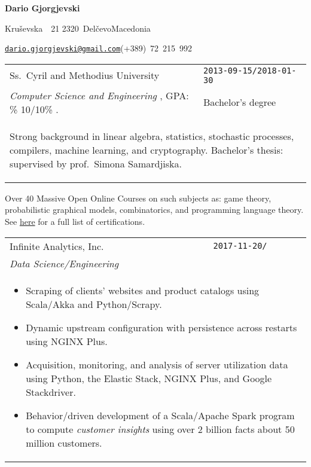\documentclass[version=last, paper=A4, DIV=12, toc=bibliography]{scrartcl}%
\makeatletter
\newcommand*{\EducationEntry}[6]{%
  \noindent%
  \begin{tabular}{p{.7\textwidth-2\tabcolsep}>{\raggedleft\arraybackslash}p{.3\textwidth-2\tabcolsep}}
    \textsf{#2} & \Verb+#1+\\
    \textit{#4}, GPA\@: \num[round-mode=places, round-precision=2, round-integer-to-decimal]{#5}. & #3\\
    \multicolumn{2}{p{\textwidth-2\tabcolsep}}{\begin{addmargin}{2em}\small#6\end{addmargin}}
  \end{tabular}%
}
\newcommand*{\WorkEntry}[4]{%
  \noindent%
  \begin{tabular}{p{.7\textwidth-2\tabcolsep}>{\raggedleft\arraybackslash}p{.3\textwidth-2\tabcolsep}}
    \textsf{#2} & \Verb+#1+\\
    \textit{#3} &\\
    \multicolumn{2}{p{\textwidth-2\tabcolsep}}{\begin{addmargin}{2em}\small#4\end{addmargin}}
  \end{tabular}%
}
\makeatother
\begin{document}
\begin{addmargin}{.15\textwidth}
  \begin{center}
    \bfseries\LARGE Dario Gjorgjevski
  \end{center}
  \begin{FlushLeft}
    \begin{description}[itemsep=.1em, leftmargin=*]
    \item[\faHome] Kruševska~\textnumero~21\hfill\textbullet\hfill
      2320~Delčevo\hfill\textbullet\hfill Macedonia
    \item[\faAddressCard] \href{mailto:dario.gjorgjevski@gmail.com}%
      {\nolinkurl{dario.gjorgjevski@gmail.com}}\hfill (+389)~72~215~992
    \end{description}
  \end{FlushLeft}
\end{addmargin}


\EducationEntry{2013-09-15/2018-01-30}{%
  Ss.\ Cyril and Methodius University%
}{%
  Bachelor's degree%
}{%
  Computer Science and Engineering%
}{%
  10/10%
}{%
  Strong background in linear algebra, statistics, stochastic processes,
  compilers, machine learning, and cryptography.  Bachelor's thesis:
  \textquote[][,]{Error\-/Correcting Codes in the Rank Metric (With Applications
    to Cryptography)} supervised by prof.\ Simona Samardjiska.%
}

{\noindent\small Over \num{40} Massive Open Online Courses on such subjects as:
  game theory, probabilistic graphical models, combinatorics, and programming
  language theory.  See
  \href{https://github.com/d125q/Personal/tree/master/Certifications}{here} for
  a full list of certifications.\par}


\WorkEntry{2017-11-20/}{%
  Infinite Analytics, Inc.%
}{%
  Data Science/Engineering%
}{%
  \begin{itemize}[noitemsep, leftmargin=*]
  \item Scraping of clients' websites and product catalogs using Scala/Akka and
    Python/Scrapy.
  \item Dynamic upstream configuration with persistence across restarts using
    NGINX Plus.
  \item Acquisition, monitoring, and analysis of server utilization data using
    Python, the Elastic Stack, NGINX Plus, and Google Stackdriver.
  \item Behavior\-/driven development of a Scala/Apache Spark program to compute
    \emph{customer insights} using over \num{2} billion facts about \num{50}
    million customers.
  \end{itemize}%
}
\end{document}
